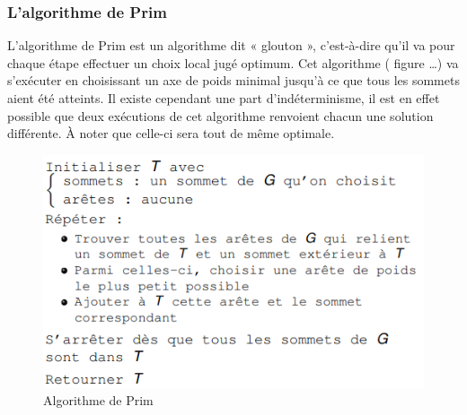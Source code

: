 \documentclass[memoire.tex]{subfiles}
\begin{document}
\subsubsection{L'algorithme de Prim}
L’algorithme de Prim est un algorithme dit « glouton », c'est-à-dire qu’il va pour chaque étape effectuer un choix local jugé optimum. Cet algorithme ( figure …) va s’exécuter en choisissant un axe de poids minimal jusqu’à ce que tous les sommets aient été atteints. Il existe cependant une part d'indéterminisme, il est en effet possible que deux exécutions de cet algorithme renvoient chacun une solution différente. À noter que celle-ci sera tout de même optimale.
	\begin{figure}[h!]
		\centerline{\includegraphics[scale=0.8]{img/prim.png}}
		\caption{Algorithme de Prim}
	\end{figure}
\newpage
\end{document}
